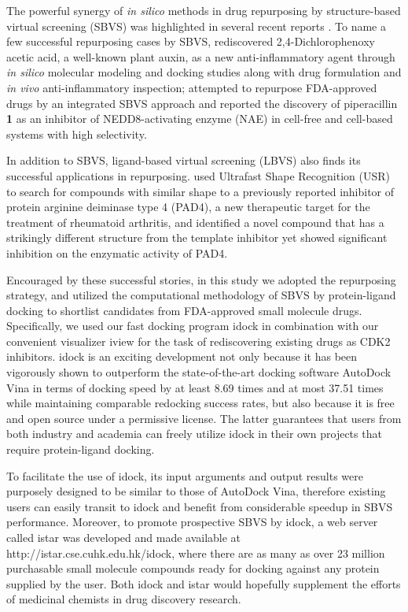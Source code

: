 \documentclass[10pt]{article}
\begin{document}
The powerful synergy of \textit{in silico} methods in drug repurposing by structure-based virtual screening (SBVS) was highlighted in several recent reports \citep{1384}. To name a few successful repurposing cases by SBVS, \citep{1507} rediscovered 2,4-Dichlorophenoxy acetic acid, a well-known plant auxin, as a new anti-inflammatory agent through \textit{in silico} molecular modeling and docking studies along with drug formulation and \textit{in vivo} anti-inflammatory inspection; \citep{1506} attempted to repurpose FDA-approved drugs by an integrated SBVS approach and reported the discovery of piperacillin \textbf{1} as an inhibitor of NEDD8-activating enzyme (NAE) in cell-free and cell-based systems with high selectivity.

In addition to SBVS, ligand-based virtual screening (LBVS) also finds its successful applications in repurposing. \citep{1504} used Ultrafast Shape Recognition (USR) \citep{1379} to search for compounds with similar shape to a previously reported inhibitor of protein arginine deiminase type 4 (PAD4), a new therapeutic target for the treatment of rheumatoid arthritis, and identified a novel compound that has a strikingly different structure from the template inhibitor yet showed significant inhibition on the enzymatic activity of PAD4.

Encouraged by these successful stories, in this study we adopted the repurposing strategy, and utilized the computational methodology of SBVS by protein-ligand docking to shortlist candidates from FDA-approved small molecule drugs. Specifically, we used our fast docking program idock \citep{1153,1362} in combination with our convenient visualizer iview \citep{1366} for the task of rediscovering existing drugs as CDK2 inhibitors. idock is an exciting development not only because it has been vigorously shown \citep{1362} to outperform the state-of-the-art docking software AutoDock Vina \citep{595} in terms of docking speed by at least 8.69 times and at most 37.51 times while maintaining comparable redocking success rates, but also because it is free and open source under a permissive license. The latter guarantees that users from both industry and academia can freely utilize idock in their own projects that require protein-ligand docking.

To facilitate the use of idock, its input arguments and output results were purposely designed to be similar to those of AutoDock Vina, therefore existing users can easily transit to idock and benefit from considerable speedup in SBVS performance. Moreover, to promote prospective SBVS by idock, a web server called istar \citep{1362} was developed and made available at http://istar.cse.cuhk.edu.hk/idock, where there are as many as over 23 million purchasable small molecule compounds ready for docking against any protein supplied by the user. Both idock \citep{1153} and istar \citep{1362} would hopefully supplement the efforts of medicinal chemists in drug discovery research.
\end{document}
